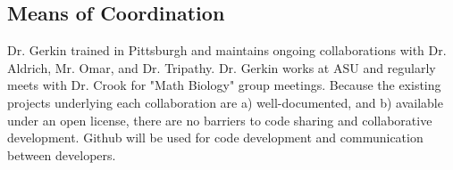 \documentclass[11pt,letterpaper]{article}
\begin{document}

\subsection{Means of Coordination}
Dr. Gerkin trained in Pittsburgh and maintains ongoing collaborations with Dr. Aldrich, Mr. Omar, and Dr. Tripathy.  Dr. Gerkin works at ASU and regularly meets with Dr. Crook for "Math Biology" group meetings.  Because the existing projects underlying each collaboration are a) well-documented, and b) available under an open license, there are no barriers to code sharing and collaborative development.  Github will be used for code development and communication between developers.

\end{document}
